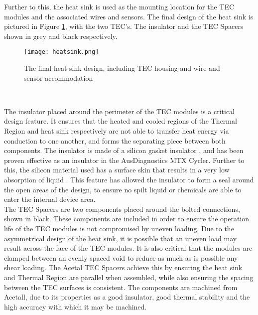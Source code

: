 Further to this, the heat sink is used as the mounting location for the TEC modules and the associated wires and sensors. The final design of the heat sink is pictured in Figure \ref{fig:heatsink}, with the two TEC's. The insulator and the TEC Spacers shown in grey and black respectively.

\begin{figure}[!htb]
	\centering
	\texttt{[image: heatsink.png]}
	\caption[Heat sink final design.]{The final heat sink design, including TEC housing and wire and sensor accommodation}
	\label{fig:heatsink}
\end{figure} 
\FloatBarrier

The insulator placed around the perimeter of the TEC modules is a critical design feature. It ensures that the heated and cooled regions of the Thermal Region and heat sink respectively are not able to transfer heat energy via conduction to one another, and forms the separating piece between both components. The insulator is made of a silicon gasket insulator \cite{jehbco}, and has been proven effective as an insulator in the AusDiagnostics MTX Cycler. Further to this, the silicon material used has a surface skin that results in a very low absorption of liquid \cite{jehbco}. This feature has allowed the insulator to form a seal around the open areas of the design, to ensure no spilt liquid or chemicals are able to enter the internal device area.\\

The TEC Spacers are two components placed around the bolted connections, shown in black. These components are included in order to ensure the operation life of the TEC modules is not compromised by uneven loading. Due to the asymmetrical design of the heat sink, it is possible that an uneven load may result across the face of the TEC modules. It is also critical that the modules are clamped between an evenly spaced void to reduce as much as is possible any shear loading. The Acetal TEC Spacers achieve this by ensuring the heat sink and Thermal Region are parallel when assembled, while also ensuring the spacing between the TEC surfaces is consistent. The components are machined from Acetall, due to its properties as a good insulator, good thermal stability and the high accuracy with which it may be machined.

